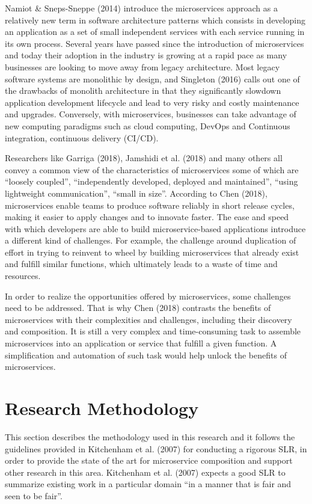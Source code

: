 \documentclass{article}
\begin{document}
\begin{multicols}{2}
Namiot \& Sneps-Sneppe (2014) introduce the microservices approach as a relatively new term in software architecture patterns which consists in developing an application as a set of small independent services with each service running in its own process. Several years have passed since the introduction of microservices and today their adoption in the industry is growing at a rapid pace as many businesses are looking to move away from legacy architecture. Most legacy software systems are monolithic by design, and Singleton (2016) calls out one of the drawbacks of monolith architecture in that they significantly slowdown application development lifecycle and lead to very risky and costly maintenance and upgrades. Conversely, with microservices, businesses can take advantage of new computing paradigms such as cloud computing, DevOps and Continuous integration, continuous delivery (CI/CD). 

Researchers like Garriga (2018), Jamshidi et al. (2018) and many others all convey a common view of the characteristics of microservices some of which are “loosely coupled”, “independently developed, deployed and maintained”, “using lightweight communication”, “small in size”. According to Chen (2018), microservices enable teams to produce software reliably in short release cycles, making it easier to apply changes and to innovate faster. The ease and speed with which developers are able to build microservice-based applications introduce a different kind of challenges. For example, the challenge around duplication of effort in trying to reinvent to wheel by building microservices that already exist and fulfill similar functions, which ultimately leads to a waste of time and resources. 

In order to realize the opportunities offered by microservices, some challenges need to be addressed. That is why Chen (2018) contrasts the benefits of microservices with their complexities and challenges, including their discovery and composition. It is still a very complex and time-consuming task to assemble microservices into an application or service that fulfill a given function. A simplification and automation of such task would help unlock the benefits of microservices.


\section{Research Methodology}

This section describes the methodology used in this research and it follows the guidelines provided in Kitchenham et al. (2007) for conducting a rigorous SLR, in order to provide the state of the art for microservice composition and support other research in this area. Kitchenham et al. (2007) expects a good SLR to summarize existing work in a particular domain “in a manner that is fair and seen to be fair”.


\end{multicols}
\end{document}
